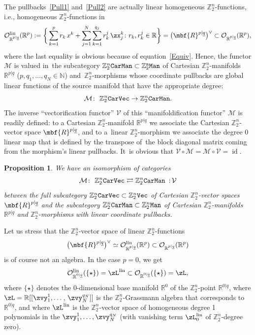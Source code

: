 \documentclass[10pt,a4paper]{amsart}
\newcommand{\op}[1]{\operatorname{#1}}
\newcommand{\R}{{\mathbb R}}
\newcommand{\Z}{{\mathbb Z}}
\def\ul{\underline}
\def\cM{\cal M}
\def\cO{\mathcal{O}}
\def\cM{\mathcal{M}}
\def\ul{\underline}
\newcommand{\0}{\otimes}
\newcommand{\z}{\Z_2^n}
\numberwithin{equation}{section}
\newtheorem{Proposition}[Theorem]{Proposition}
 { \theoremstyle{definition}
\newtheorem{Definition}[Theorem]{Definition}
\newtheorem{Example}[Theorem]{Example}
\newtheorem{Remark}[Theorem]{Remark} }
\providecommand{\cal}{\mathcal}
\begin{document}
\newcommand{\cV}{\mathcal{V}}

The pullbacks~\eqref{Pull1} and~\eqref{Pull2} are actually linear homogeneous $\z$-functions, i.e., homogeneous $\z$-functions in
\begin{gather}\label{LinFun}
\cO^{\op{lin}}_{\R^{p|\ul q}}(\R^p):=\bigg\{\sum_{k=1}^{p} r_k\,x^k+\sum_{j=1}^N\sum_{k=1}^{q_j} r^j_k\,\zx^k_j\colon r_k, r^j_k\in\R\bigg\}=\big(\mbf{R}^{p|\ul q}\big)^\vee\subset\cO_{\R^{p|\ul q}}(\R^{p}),
\end{gather}
where the last equality is obvious because of equation~\eqref{Equiv}. Hence, the functor $\cM$ is valued in~the subcategory $\Z_2^n\tt{CarMan}\subset\Z_2^n\tt Man$ of Cartesian $\Z_2^n$-manifolds $\R^{p|\ul q}$ ($p,q_1,\dots,q_N\in\mathbb N$) and~$\Z_2^n$-morphisms whose coordinate pullbacks are global linear functions of the source manifold that have the appropriate degree:
\[
\mathcal{M}\colon\ \Z_2^n{\tt CarVec}\to \Z_2^n\tt CarMan.
\]
The inverse ``vectorification functor'' $\cV$ of this ``manifoldification functor'' $\cM$ is readily defined: to a Cartesian $\Z_2^n$-manifold $\R^{p|\ul q}$ we associate the Cartesian $\Z_2^n$-vector space $\mbf{R}^{p|\ul q}$, and to a~linear $\Z_2^n$-morphism we associate the degree 0 linear map that is defined by the transpose of~the block diagonal matrix coming from the morphism's linear pullbacks. It~is obvious that $\cV\circ\cM=\cM\circ\cV=\op{id}$.

\begin{Proposition}\label{IsoCatCar}
We have an isomorphism of categories
\begin{gather}\label{FunEquivCar}
\mathcal{M}\colon\ \Z_2^n{\tt CarVec}\rightleftarrows\Z_2^n\tt CarMan\ \, {:}\,\cV
\end{gather}
between the full subcategory $\Z_2^n{\tt CarVec}\subset\Z_2^n\tt{Vec}$ of Cartesian $\Z_2^n$-vector spaces $\mbf{R}^{p|\ul q}$ and the subcategory $\Z_2^n{\tt Car}{\tt Man}\subset\Z_2^n{\tt Man}$ of Cartesian $\Z_2^n$-manifolds $\R^{p|\ul q}$ and $\Z_2^n$-morphisms with linear coordinate pullbacks.
\end{Proposition}

\begin{Remark} Let us stress that the $\Z_2^n$-vector space of linear $\z$-functions
\[
\big(\mbf{R}^{p|\ul q}\big)^\vee\simeq\cO_{\R^{p|\ul q}}^{\op{lin}}(\R^{p})\subset \cO_{\R^{p|\ul q}}(\R^p)
\]
is of course not an algebra. In the case $p=0$, we get
\[
\cO^{\op{lin}}_{\R^{0|\ul q}}(\{\star\})=\zL^{\op{lin}}\subset\cO_{\R^{0|\ul q}}(\{\star\})=\zL,
\]
where $\{\star\}$ denotes the 0-dimensional base manifold $\R^0$ of the $\z$-point $\R^{0|\ul q}$, where $\zL=\R[[\zvy^1_1,\dots$, $\zvy^{q_N}_N]]$ is the $\z$-Grassmann algebra that corresponds to $\R^{0|\ul q}$, and where $\zL^{\op{lin}}$ is the $\z$-vector space of homogeneous degree 1 polynomials in the $\zvy_1^1,\dots,\zvy_N^{q_N}$ (with vanishing term $\zL_0^{\op{lin}}$ of $\z$-degree zero).
\end{Remark}
\end{document}

